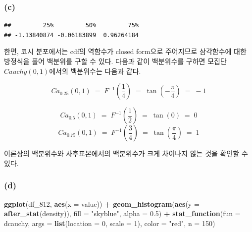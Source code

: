 \documentclass[
]{article}
\newenvironment{Shaded}{\begin{snugshade}}{\end{snugshade}}
\newcommand{\AttributeTok}[1]{\textcolor[rgb]{0.13,0.29,0.53}{#1}}
\newcommand{\DecValTok}[1]{\textcolor[rgb]{0.00,0.00,0.81}{#1}}
\newcommand{\FloatTok}[1]{\textcolor[rgb]{0.00,0.00,0.81}{#1}}
\newcommand{\FunctionTok}[1]{\textcolor[rgb]{0.13,0.29,0.53}{\textbf{#1}}}
\newcommand{\NormalTok}[1]{#1}
\newcommand{\SpecialCharTok}[1]{\textcolor[rgb]{0.81,0.36,0.00}{\textbf{#1}}}
\newcommand{\StringTok}[1]{\textcolor[rgb]{0.31,0.60,0.02}{#1}}
\begin{document}
\subsubsection{(c)}\label{c-1}

\begin{Shaded}
\end{Shaded}

\begin{verbatim}
##         25%         50%         75% 
## -1.13840874 -0.06183899  0.96264184
\end{verbatim}

한편, 코시 분포에서는 cdf의 역함수가 closed form으로 주어지므로
삼각함수에 대한 방정식을 풀어 백분위를 구할 수 있다. 다음과 같이
백분위수를 구하면 모집단 \(Cauchy(0, 1)\)에서의 백분위수는 다음과 같다.

\[
Ca_{0.25}(0, 1) \; = \; F^{-1}(\frac{1}{4})\; = \; \tan(-\frac{\pi}{4}) \; = \; -1
\]

\[
Ca_{0.5}(0, 1) \; = \; F^{-1}(\frac{1}{2})\; = \; \tan(0) \; = \; 0
\] \[
Ca_{0.75}(0, 1) \; = \; F^{-1}(\frac{3}{4})\; = \; \tan(\frac{\pi}{4}) \; = \; 1
\]

이론상의 백분위수와 사후표본에서의 백분위수가 크게 차이나지 않는 것을
확인할 수 있다.

\subsubsection{(d)}\label{d-1}

\begin{Shaded}
\begin{Highlighting}[]
\FunctionTok{ggplot}\NormalTok{(df\_812, }\FunctionTok{aes}\NormalTok{(}\AttributeTok{x =}\NormalTok{ value)) }\SpecialCharTok{+}
  \FunctionTok{geom\_histogram}\NormalTok{(}\FunctionTok{aes}\NormalTok{(}\AttributeTok{y =} \FunctionTok{after\_stat}\NormalTok{(density)), }\AttributeTok{fill =} \StringTok{"skyblue"}\NormalTok{, }\AttributeTok{alpha =} \FloatTok{0.5}\NormalTok{) }\SpecialCharTok{+}
  \FunctionTok{stat\_function}\NormalTok{(}\AttributeTok{fun =}\NormalTok{ dcauchy, }\AttributeTok{args =} \FunctionTok{list}\NormalTok{(}\AttributeTok{location =} \DecValTok{0}\NormalTok{, }\AttributeTok{scale =} \DecValTok{1}\NormalTok{), }\AttributeTok{color =} \StringTok{"red"}\NormalTok{, }\AttributeTok{n =} \DecValTok{150}\NormalTok{)   }
\end{Highlighting}
\end{Shaded}
\end{document}
